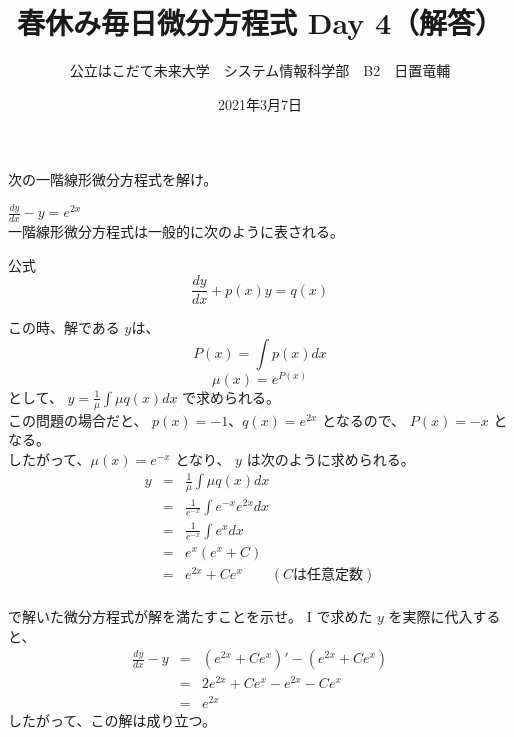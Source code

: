 \documentclass[dvipdfmx,uplatex]{jsarticle}
\title{春休み毎日微分方程式 Day 4（解答）}
\author{公立はこだて未来大学　システム情報科学部　B2　日置竜輔}
\date{2021年3月7日}
\begin{document}
\begin{spacing}{1.6}
\maketitle

次の一階線形微分方程式を解け。
\begin{qparts}
    \qpart $ \displaystyle \frac{dy}{dx} - y = e ^ {2x} $ \\
    一階線形微分方程式は一般的に次のように表される。\\
    \begin{itembox}{公式}
       \begin{equation}
         \frac{dy}{dx} + p(x)y = q(x) \nonumber
       \end{equation}
    \end{itembox}
     この時、解である $ y $は、\\
     \begin{equation}
       P(x) = \int p(x) dx \nonumber
     \end{equation}
     \begin{equation}
       \mu (x) = e ^ {P(x)} \nonumber
     \end{equation}
     として、 $ \displaystyle y = \frac{1}{\mu} \int \mu q(x) dx $ で求められる。\\
     この問題の場合だと、 $ p(x) =-1 $、$q(x) = e ^ {2x} $ となるので、 $ P(x) = - x $ となる。 \\
     したがって、$ \mu (x) = e ^ {-x} $ となり、 $ y $ は次のように求められる。\\
     \begin{eqnarray*}
       y & = & \frac{1}{\mu} \int \mu q(x) dx \\
       & = & \frac{1}{e ^ {-x}} \int e ^ {-x} e ^ {2x} dx \\
       & = & \frac{1}{e ^ {-x}} \int e ^ x dx \\
       & = & e ^ x (e ^ x + C) \\
       & = & e ^ {2x} + Ce ^ x \qquad (Cは任意定数) \\
     \end{eqnarray*}

      で解いた微分方程式が解を満たすことを示せ。
     {\rm I} で求めた $ y $ を実際に代入すると、 \\
     \begin{eqnarray*}
       \frac{dy}{dx} - y & = & {(e ^ {2x} + Ce ^ x)\prime} - (e ^ {2x} + Ce ^ x) \\
       & = & 2 e ^ {2x} + Ce ^ x - e ^ {2x} - Ce ^ x \\
       & = & e ^ {2x}
     \end{eqnarray*}
     したがって、この解は成り立つ。
\end{qparts}

\end{spacing}
\end{document}
